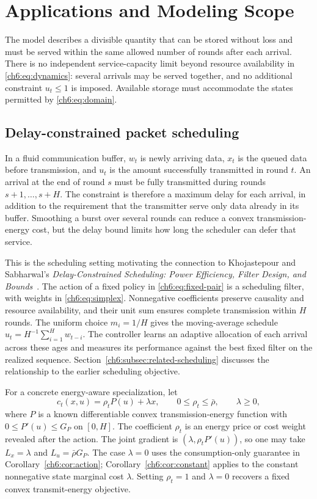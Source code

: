 \documentclass[11pt]{article}
\theoremstyle{plain}
\theoremstyle{remark}
\numberwithin{equation}{section}
\begin{document}
\section{Applications and Modeling Scope}
\label{ch6:sec:applications}

The model describes a divisible quantity that can be stored without loss
and must be served within the same allowed number of rounds after each arrival. There is no
independent service-capacity limit beyond resource availability in
\eqref{ch6:eq:dynamics}: several arrivals may be served together, and no
additional constraint $u_t\le1$ is imposed. Available storage must accommodate
the states permitted by \eqref{ch6:eq:domain}.

\subsection{Delay-constrained packet scheduling}
\label{ch6:subsec:delay-scheduling}

In a fluid communication buffer, $w_t$ is newly arriving data, $x_t$ is
the queued data before transmission, and $u_t$ is the amount successfully
transmitted in round $t$. An arrival at the end of round $s$ must be fully
transmitted during rounds $s+1,\ldots,s+H$. The constraint is therefore a
maximum delay for each arrival, in addition to the requirement that the
transmitter serve only data already in its buffer. Smoothing a burst over
several rounds can reduce a convex transmission-energy cost, but the delay
bound limits how long the scheduler can defer that service.

This is the scheduling setting motivating the connection to
Khojastepour and Sabharwal's \emph{Delay-Constrained Scheduling: Power
Efficiency, Filter Design, and Bounds}~\cite{khojastepour2004delay}.
The action of a fixed policy in \eqref{ch6:eq:fixed-pair} is a scheduling filter,
with weights in \eqref{ch6:eq:simplex}.
Nonnegative coefficients preserve causality and resource availability,
and their unit sum ensures complete transmission within $H$ rounds.
The uniform choice $m_i=1/H$ gives the moving-average schedule
$u_t=H^{-1}\sum_{i=1}^{H}w_{t-i}$.
The controller learns an adaptive allocation of each arrival across
these ages and measures its performance against the best fixed filter
on the realized sequence. Section~\ref{ch6:subsec:related-scheduling}
discusses the relationship to the earlier scheduling objective.

For a concrete energy-aware specialization, let
\[
 c_t(x,u)=\rho_t P(u)+\lambda x,
 \qquad 0\le\rho_t\le\bar\rho,\qquad \lambda\ge0,
\]
where $P$ is a known differentiable convex transmission-energy function
with $0\le P'(u)\le G_P$ on $[0,H]$. The coefficient $\rho_t$ is an
energy price or cost weight revealed after the action. The joint gradient
is $(\lambda,\rho_tP'(u))$, so one may take $L_x=\lambda$ and
$L_u=\bar\rho G_P$. The case $\lambda=0$ uses the consumption-only
guarantee in Corollary~\ref{ch6:cor:action}; Corollary~\ref{ch6:cor:constant}
applies to the constant nonnegative state marginal cost $\lambda$. Setting $\rho_t=1$ and
$\lambda=0$ recovers a fixed convex transmit-energy objective.
\end{document}
